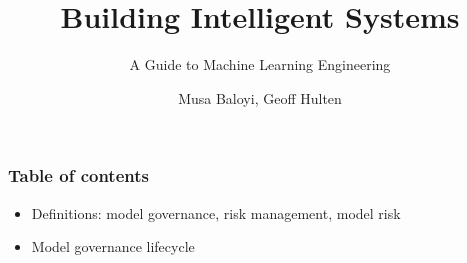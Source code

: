 \documentclass[11pt]{beamer}
\begin{document}
	\author{Musa Baloyi, Geoff Hulten}
	\title{Building Intelligent Systems}
	\subtitle{A Guide to Machine Learning Engineering}
	\begin{frame}[plain]
	\maketitle
\end{frame}

\begin{frame}
\frametitle{Table of contents}
\begin{itemize}
	\item Definitions: model governance, risk management, model risk
	\item Model governance lifecycle
\end{itemize}
\end{frame}


%
%
\end{document}
